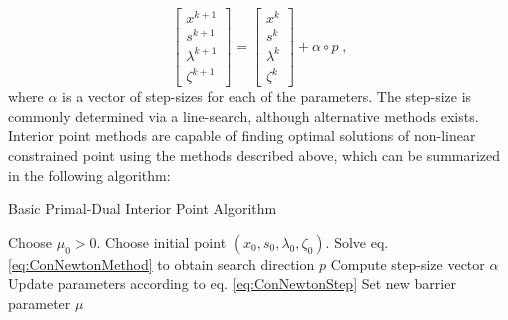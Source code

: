 \begin{equation}
\begin{bmatrix}
  x^{k+1} \\ s^{k+1} \\ \lambda^{k+1} \\ \zeta^{k+1} 
\end{bmatrix} 
=
\begin{bmatrix}
  x^{k} \\ s^{k} \\ \lambda^{k} \\ \zeta^{k} 
\end{bmatrix} 
+ \alpha \circ p \; ,
\label{eq:ConNewtonStep}
\end{equation}
where $\alpha$ is a vector of step-sizes for each of the parameters. The step-size is commonly determined via a line-search, although alternative methods exists.\\
Interior point methods are capable of finding optimal solutions of non-linear constrained point using the methods described above, which can be summarized in the following algorithm:
\begin{algorithm}
\begin{algorithmic}
\caption{Basic Primal-Dual Interior Point Algorithm}
\State Choose $\mu_0 > 0$.
\State Choose initial point $(x_0 , s_0 ,  \lambda_0 , \zeta_0)$.
	\State Solve eq. \eqref{eq:ConNewtonMethod} to obtain search direction $p$
	\State Compute step-size vector $\alpha$
	\State Update parameters according to eq. \eqref{eq:ConNewtonStep}	
	\State Set new barrier parameter $\mu$
\EndWhile
\end{algorithmic}
\end{algorithm}

